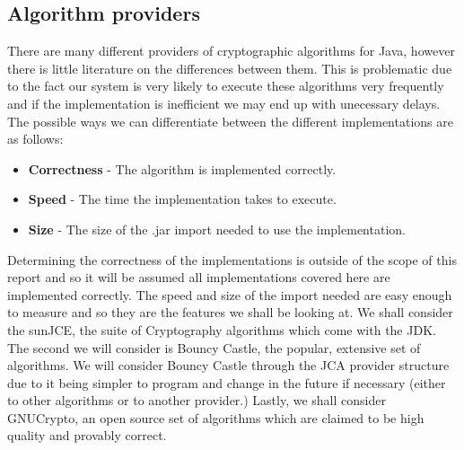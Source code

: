 \documentclass[12pt, titlepage]{article}
\begin{document}
\subsection*{Algorithm providers}
There are many different providers of cryptographic algorithms for Java, however there is little literature on the differences between them. This is problematic due to the fact our system is very likely to execute these algorithms very frequently and if the implementation is inefficient we may end up with unecessary delays. The possible ways we can differentiate between the different implementations are as follows:
\begin{itemize}
	\item \textbf{Correctness} - The algorithm is implemented correctly.
	\item \textbf{Speed} - The time the implementation takes to execute.
	\item \textbf{Size} - The size of the .jar import needed to use the implementation.
\end{itemize}
Determining the correctness of the implementations is outside of the scope of this report and so it will be assumed all implementations covered here are implemented correctly. The speed and size of the import needed are easy enough to measure and so they are the features we shall be looking at.
\newline \indent We shall consider the sunJCE, the suite of Cryptography algorithms which come with the JDK. The second we will consider is Bouncy Castle, the popular, extensive set of algorithms. We will consider Bouncy Castle through the JCA provider structure due to it being simpler to program and change in the future if necessary (either to other algorithms or to another provider.) Lastly, we shall consider GNUCrypto, an open source set of algorithms which are claimed to be high quality and provably correct.
\end{document}
